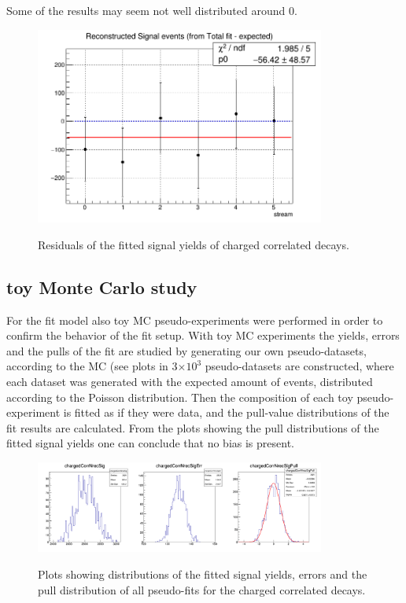 Some of the results may seem not well distributed around 0.
 

\begin{figure}[H]
    \centering
    {\includegraphics[width=0.85\textwidth]{04-SimultaneousFit/figs/6streamResults_chargedCorrelated_correct.png}}
    \caption{Residuals of the fitted signal yields of charged correlated decays.}
    \label{fig:6streamResults_chargedCorrelated_correct}
    \end{figure}



\newpage

\subsection{toy Monte Carlo study}

For the fit model also toy MC pseudo-experiments were performed in order to confirm the behavior of the fit setup. 
With toy MC experiments the yields, errors and the pulls of the fit are studied by generating our own pseudo-datasets, according to the MC (see plots in
3$\times 10^3$ pseudo-datasets are constructed, where each dataset was generated with the expected amount of events, 
distributed according to the Poisson distribution. Then the composition of each toy pseudo-experiment is fitted as if they were data, and
the pull-value distributions of the fit results are calculated. From the plots showing the  
 pull distributions of the fitted signal yields one can conclude that no bias is present. 
 
 

\begin{figure}[H]
    \centering
    {\includegraphics[width=0.85\textwidth]{04-SimultaneousFit/figs/chargedCorrNrecSigPull.png}}
    \caption{Plots showing distributions of the fitted signal yields, errors and the pull
    distribution of all pseudo-fits for the charged correlated decays.}
    \label{fig:2DchargedCorrNrecSigToys}
    \end{figure}


